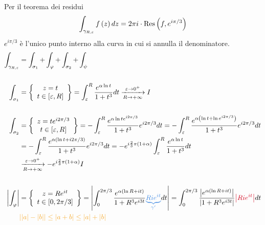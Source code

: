 Per il teorema dei residui
\begin{equation*}
\int_{\gamma_{R, \varepsilon}} f\left(z\right) dz = 2\pi i \cdot \operatorname{Res} \left(f, e^{i\pi /3}\right)
\end{equation*}
$e^{i\pi /3}$ è l'unico punto interno alla curva in cui si annulla il denominatore.
\begin{equation*}
\begin{aligned}
\int_{\gamma_{R, \varepsilon}} & = \int_{\sigma_{1}} + \int_{\varphi} + \int_{\sigma_{2}} + \int_{\psi}\\
 & \\
\int_{\sigma_{1}} & = \left\{
\begin{array}{c}
z = t\\
t\in [ \varepsilon, R]
\end{array}\right\} = \int^{R}_{\varepsilon}\frac{e^{\alpha \ln t}}{1 + t^{3}} dt\xrightarrow[R\rightarrow + \infty ]{\varepsilon \rightarrow 0^{+}} I\\
 & \\
\int_{\sigma_{2}} & = \left\{
\begin{array}{c}
z = te^{i2\pi /3}\\
t\in [ \varepsilon, R]
\end{array}\right\} = - \int^{R}_{\varepsilon}\frac{e^{\alpha \ln te^{i2\pi /3}}}{1 + t^{3}} e^{i2\pi /3} dt = -\int^{R}_{\varepsilon}\frac{e^{\alpha \left(\ln t + \ln e^{i2\pi /3}\right)}}{1 + t^{3}} e^{i2\pi /3} dt\\
 & = - \int^{R}_{\varepsilon}\frac{e^{\alpha (\ln t + i2\pi /3)}}{1 + t^{3}} e^{i2\pi /3} dt = -e^{i\frac{2}{3} \pi (1 + \alpha)}\int^{R}_{\varepsilon}\frac{e^{\alpha \ln t}}{1 + t^{3}} dt\\
 & \xrightarrow[R\rightarrow + \infty ]{\varepsilon \rightarrow 0^{+}} - e^{i\frac{2}{3} \pi (1 + \alpha)} I\\
 & \\
\left| \int_{\varphi}\right|  & = \left\{
\begin{array}{c}
z = Re^{it}\\
t\in [ 0, 2\pi /3]
\end{array}\right\} = \left| \int^{2\pi /3}_{0}\frac{e^{\alpha (\ln R + it)}}{1 + R^{3} e^{i3t}}\textcolor[rgb]{0.29, 0.56, 0.89}{\underbrace{Rie^{it}}_{\gamma '}} dt\right| = \int^{2\pi /3}_{0}\frac{\left| e^{\alpha (\ln R + it)}\right|}{\left| 1 + R^{3} e^{i3t}\right|}\textcolor[rgb]{0.82, 0.01, 0.11}{\left| Rie^{it}\right|} dt\\
 & \textcolor[rgb]{0.96, 0.65, 0.14}{| | a| - | b| | \leq | a + b| \leq | a| + | b|}\\

\end{aligned}
\end{equation*}
